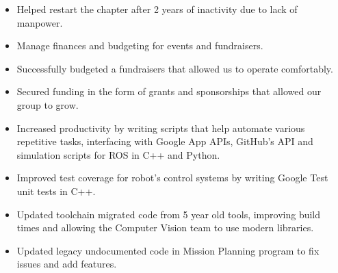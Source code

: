 \documentclass[10pt,a4paper,ragged2e,academicons]{altacv}
\begin{document}
\begin{paracol}{2}

  \begin{itemize}
    \item Helped restart the chapter after 2 years of inactivity due to lack of manpower.
    \item Manage finances and budgeting for events and fundraisers.
    \item Successfully budgeted a fundraisers that allowed us to operate comfortably.
    \item Secured funding in the form of grants and sponsorships that allowed our group to grow.
  \end{itemize}
  \divider\small

  \begin{itemize}
    \item Increased productivity by writing scripts that help automate various repetitive tasks, interfacing with Google App APIs, GitHub’s API and simulation scripts for ROS in C++ and Python.
    \item Improved test coverage for robot’s control systems by writing Google Test unit tests in C++.
    \item Updated toolchain migrated code from 5 year old tools, improving build times and allowing the Computer Vision team to use modern libraries.
    \item Updated legacy undocumented code in Mission Planning program to fix issues and add features.
  \end{itemize}
  \divider\small

\end{paracol}
\end{document}
